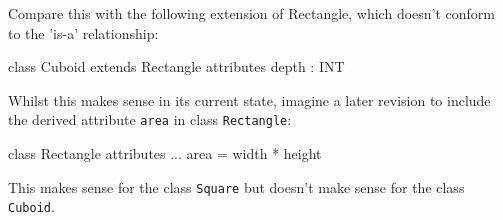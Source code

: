Compare this with the following extension of Rectangle, which doesn't
conform to the 'is-a' relationship:

\begin{code}
class Cuboid extends Rectangle {
  attributes
    depth : INT
}
\end{code}

Whilst this makes sense in its current state, imagine a later revision
to include the derived attribute \verb|area| in class
\verb|Rectangle|:

\begin{code}
class Rectangle {
  attributes
    ...
    area = width * height
}
\end{code}

This makes sense for the class \verb|Square| but doesn't make sense
for the class \verb|Cuboid|.
